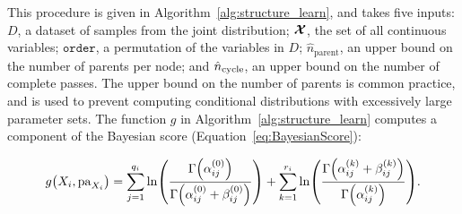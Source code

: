 This procedure is given in Algorithm~\ref{alg:structure_learn}, and takes five inputs: $D$, a dataset of samples from the joint distribution; $\bm{\mathcal{X}}$, the set of all continuous variables; $\texttt{order}$, a permutation of the variables in $D$; $\hat{n}_\text{parent}$, an upper bound on the number of parents per node; and $\hat{n}_\text{cycle}$, an upper bound on the number of complete passes.
The upper bound on the number of parents is common practice, and is used to prevent computing conditional distributions with excessively large parameter sets.
The function $g$ in Algorithm~\ref{alg:structure_learn} computes a component of the Bayesian score (Equation~\ref{eq:BayesianScore}):

\begin{equation}
  \label{eq:B_Score_one}
  g\paren{X_i, \Pa_{X_i}} =  \sum_{j=1}^{q_i} \ln\paren{
    \frac{
      \mathrm{\Gamma}\paren{\alpha_{ij}^{(0)}}
    }{
      \mathrm{\Gamma}\paren{\alpha_{ij}^{(0)} + \beta_{ij}^{(0)}}
    }
  } + \sum_{k=1}^{r_i} \ln \paren{
    \frac{
      \mathrm{\Gamma}\paren{\alpha_{ij}^{(k)} + \beta_{ij}^{(k)}}
    }{
      \mathrm{\Gamma}\paren{\alpha_{ij}^{(k)}}
    }
  }\text{.}
\end{equation}

